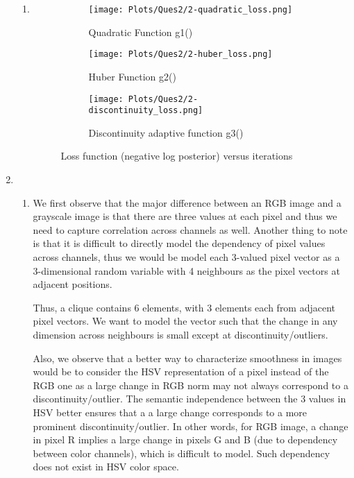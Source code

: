\documentclass[11pt]{article}
\begin{document}
\begin{enumerate}
\begin{enumerate}
        \item \begin{figure}[H]
            \centering
            \begin{subfigure}[b]{0.4\textwidth}
                 \centering
                 \texttt{[image: Plots/Ques2/2-quadratic\_loss.png]}
                 \caption{Quadratic Function g1()}
            \end{subfigure}
            \begin{subfigure}[b]{0.4\textwidth}
                 \centering
                 \texttt{[image: Plots/Ques2/2-huber\_loss.png]}
                 \caption{Huber Function g2()}
            \end{subfigure}
            \begin{subfigure}[b]{0.4\textwidth}
                 \centering
                 \texttt{[image: Plots/Ques2/2-discontinuity\_loss.png]}
                 \caption{Discontinuity adaptive function g3()}
            \end{subfigure}
            
            \caption{Loss function (negative log posterior) versus iterations}
            \label{fig:my_label}
        \end{figure}
    \end{enumerate}
    
    \item \begin{enumerate}
        \item We first observe that the major difference between an RGB image and a grayscale image is that there are three values at each pixel and thus we need to capture correlation across channels as well. Another thing to note is that it is difficult to directly model the dependency of pixel values across channels, thus we would be model each 3-valued pixel vector as a 3-dimensional random variable with 4 neighbours as the pixel vectors at adjacent positions. 
        
        Thus, a clique contains 6 elements, with 3 elements each from adjacent pixel vectors. We want to model the vector such that the change in any dimension across neighbours is small except at discontinuity/outliers.
        
        Also, we observe that a better way to characterize smoothness in images would be to consider the HSV representation of a pixel instead of the RGB one as a large change in RGB norm may not always correspond to a discontinuity/outlier. The semantic independence between the 3 values in HSV better ensures that a a large change corresponds to a more prominent discontinuity/outlier. In other words, for RGB image, a change in pixel R implies a large change in pixels G and B (due to dependency between color channels), which is difficult to model. Such dependency does not exist in HSV color space.
        

\end{enumerate}
\end{enumerate}
\end{document}

